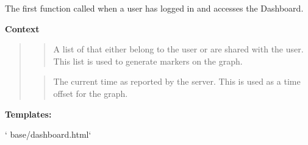 \documentclass[letterpaper,10pt,english]{sphinxmanual}
\begin{document}
\begin{fulllineitems}
\label{modules/webapp:webapp.views.default_chart}
The first function called when a user has logged in and accesses the Dashboard.

\textbf{Context}
\begin{quote}

\begin{quote}

A list of {\hyperref[modules/microdata:microdata.models.Device]{\emph{}}} that either belong to the user or are shared with the user.
This list is used to generate markers on the graph.
\end{quote}

\begin{quote}

The current time as reported by the server. This is used as a time offset for the graph.
\end{quote}
\end{quote}

\textbf{Templates:}

{}`   base/dashboard.html{}`

\end{fulllineitems}

\end{document}
